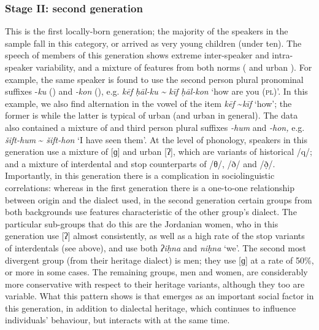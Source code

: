 \documentclass[output=paper]{langsci/langscibook}
\begin{document}
\subsubsection{Stage II: second generation}
This is the first locally-born generation; the majority of the speakers in the sample fall in this category, or arrived as very young children (under ten). The speech of members of this generation shows extreme inter-speaker and intra-speaker variability, and a mixture of features from both norms ( and urban ). For example, the same speaker is found to use the second person plural pronominal suffixes -\textit{ku} () and \textit{{}-kon} (), e.g. \textit{kēf} \textit{ḥāl-ku} \textit{{\textasciitilde} kīf ḥāl-kon} ‘how are you (\textsc{pl})'. In this example, we also find alternation in the vowel of the item \textit{kēf} {\textasciitilde}\textit{kīf} ‘how’; the former is  while the latter is typical of urban  (and urban  in general). The data also contained a mixture of  and  third person plural suffixes \textit{{}-hum} and \textit{\--hon,} e.g. \textit{šift-hum} {\textasciitilde} \textit{šift-hon} ‘I have seen them’. At the level of phonology, speakers in this generation use a mixture of  [ɡ] and urban  [ʔ], which are variants of historical /q/; and a mixture of interdental and stop counterparts of /θ/, /ð/ and /ð̣/. Importantly, in this generation there is a complication in sociolinguistic correlations: whereas in the first generation there is a one-to-one relationship between origin and the dialect used, in the second generation certain groups from both backgrounds use features characteristic of the other group’s dialect. The particular sub-groups that do this are the Jordanian women, who in this generation use  [ʔ] almost consistently, as well as a high rate of the stop variants of interdentals (see above), and use both  \textit{ʔiḥna} and  \textit{niḥna} ‘we’. The second most divergent group (from their heritage dialect) is  men; they use  [ɡ] at a rate of 50\%, or more in some cases. The remaining groups,  men and  women, are considerably more conservative with respect to their heritage variants, although they too are variable. What this pattern shows is that  emerges as an important social factor in this generation, in addition to dialectal heritage, which continues to influence individuals’ behaviour, but interacts with  at the same time. 
\end{document}
